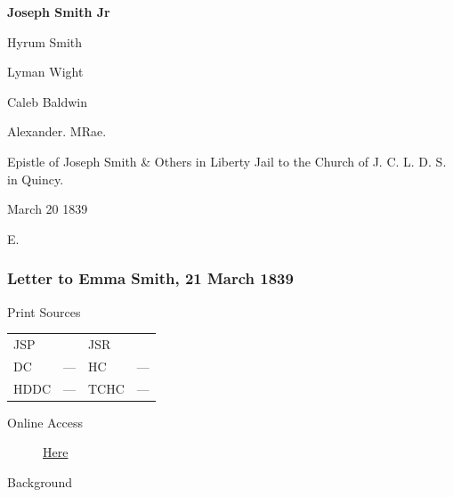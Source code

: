 					\begin{tightright}
					\textbf{Joseph Smith Jr}

					Hyrum Smith

					Lyman Wight

					Caleb Baldwin

					Alexander. MRae.
					\end{tightright}

					Epistle of Joseph Smith \& Others in Liberty Jail to the Church of J. C. L. D. S. in Quincy.

					March 20 1839

					E.
					
		\subsubsection{Letter to Emma Smith, 21 March 1839}
			\label{EMS-1839-JS-21-MAR-1839}
			
			\begin{description}
					\item[Print Sources]
				\end{description}

					\begin{tabular}{p{0.5in}p{1in}p{0.5in}p{1in}}
					JSP	 	& 			& JSR 		&  \\
					DC	 	& ---		& HC 		& --- \\
					HDDC 	& ---		& TCHC 		& --- \\
					\end{tabular}
				
				\begin{description}
					\item[Online Access] \href{https://www.josephsmithpapers.org/paper-summary/letter-to-emma-smith-21-march-1839/1}{Here}
				\end{description}
				
				\begin{description}
					\item[Background]
				\end{description}
				
				
